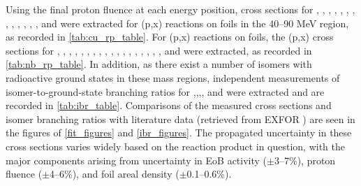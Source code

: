 \documentclass[3p]{elsarticle}
\newcommand{\comment}[1]{\todo[color=blue!20!white,inline]{ASV: #1}}
\begin{document}
Using the final proton fluence at each energy position, cross sections for  ,  , , , , , , ,  , , , , , and  were extracted for (p,x) reactions  on  foils in the 40--90 MeV region, as recorded in \autoref{tab:cu_rp_table}.
For  (p,x) reactions on  foils, the (p,x) cross sections for , , , , , , , , , , , , , , , , , , and  were extracted, as recorded in \autoref{tab:nb_rp_table}.
In addition, as there exist a number of isomers with radioactive ground states in these mass regions,  independent measurements of isomer-to-ground-state branching ratios for ,,,, and  were  extracted and are recorded in \autoref{tab:ibr_table}.
Comparisons  of the measured cross sections and isomer branching ratios with literature data (retrieved from EXFOR \cite{Otuka2014272}) are seen in the figures of \ref{fit_figures} and \ref{ibr_figures}.
The propagated uncertainty in these cross sections varies widely based on the reaction product in question, with the major components  arising from uncertainty in EoB activity ($\pm$3--7\%), proton fluence ($\pm$4--6\%), and foil areal density ($\pm$0.1--0.6\%).
\end{document}
